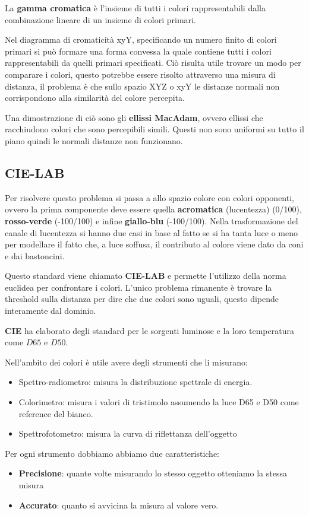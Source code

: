 \begin{definizione}
    La \textbf{gamma cromatica} è l'insieme di tutti i colori rappresentabili
    dalla combinazione lineare di un insieme di colori primari.
\end{definizione}

Nel diagramma di cromaticità xyY, specificando un numero finito di colori primari
si può formare una forma convessa la quale contiene tutti i colori rappresentabili
da quelli primari specificati. Ciò risulta utile trovare un modo per comparare i
colori, questo potrebbe essere risolto attraverso una misura di distanza, il
problema è che sullo spazio XYZ o xyY le distanze normali non corrispondono alla
similarità del colore percepita.

Una dimostrazione di ciò sono gli \textbf{ellissi MacAdam}, ovvero ellissi che
racchiudono colori che sono percepibili simili. Questi non sono uniformi su tutto
il piano quindi le normali distanze non funzionano.
\subsection{CIE-LAB}
Per risolvere questo problema si passa a allo spazio colore con colori opponenti,
ovvero la prima componente deve essere quella \textbf{acromatica} (lucentezza) (0/100),
\textbf{rosso-verde} (-100/100) e infine \textbf{giallo-blu} (-100/100). Nella
trasformazione del canale di lucentezza si hanno due casi in base al fatto se si
ha tanta luce o meno per modellare il fatto che, a luce soffusa, il contributo
al colore viene dato da coni e dai bastoncini.

Questo standard viene chiamato \textbf{CIE-LAB} e permette l'utilizzo della norma
euclidea per confrontare i colori. L'unico problema rimanente è trovare la threshold
sulla distanza per dire che due colori sono uguali, questo dipende interamente dal
dominio.

\textbf{CIE} ha elaborato degli standard per le sorgenti luminose e la loro
temperatura come $D65$ e $D50$.

Nell'ambito dei colori è utile avere degli strumenti che li misurano:
\begin{itemize}
    \item Spettro-radiometro: misura la distribuzione spettrale di energia.
    \item Colorimetro: misura i valori di tristimolo assumendo la luce D65 e D50
          come reference del bianco.
    \item Spettrofotometro: misura la curva di riflettanza dell'oggetto
\end{itemize}
Per ogni strumento dobbiamo abbiamo due caratteristiche:
\begin{itemize}
    \item \textbf{Precisione}: quante volte misurando lo stesso oggetto otteniamo
          la stessa misura
    \item \textbf{Accurato}: quanto si avvicina la misura al valore vero.
\end{itemize}

